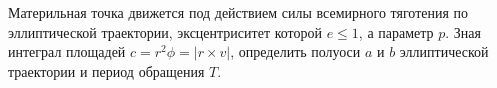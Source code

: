 Материльная точка движется под действием силы всемирного тяготения по эллиптической траектории, эксцентриситет которой
$e\leq1$, а параметр $p$. Зная интеграл площадей $c=r^2\phi=|r\times v|$, определить полуоси $a$ и $b$ эллиптической 
траектории и период обращения $T$.
